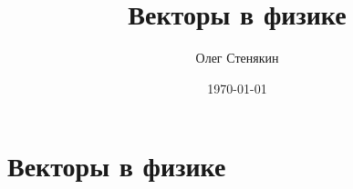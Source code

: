 \documentclass[a4paper, 12pt]{article}
\title{Векторы в физике}
\author{Олег Стенякин}
\date{\today}
\begin{document}
\part*{Векторы в физике}

\tableofcontents

\clearpage


\clearpage


\clearpage


\clearpage


\clearpage


\clearpage


\clearpage


\clearpage


\clearpage

\end{document}
